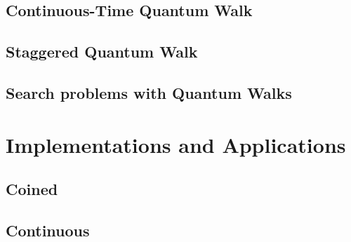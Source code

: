 \documentclass[
oneside,
11pt, a4paper,
footinclude=true,
headinclude=true,
cleardoublepage=empty
]{scrbook}
\begin{document}
\section{Continuous-Time Quantum Walk}\label{sec:chap3Contwalk}

\section{Staggered Quantum Walk}\label{sec:chap3StagWalk}

\section{Search problems with Quantum Walks}\label{sec:chap3Search}


\chapter{Implementations and Applications}
\section{Coined}\label{coinedQWQiskit}

\section{Continuous}

\end{document}
